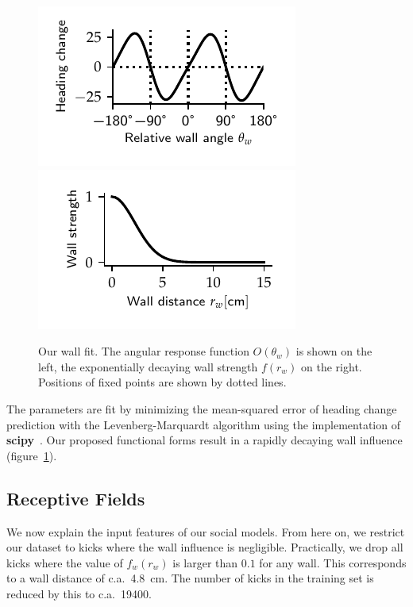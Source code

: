\documentclass[nobib, a4paper]{tufte-handout}
\begin{document}
\begin{figure}[htb]
 \centering
 \includegraphics{wall_odd}~%
 \includegraphics{wall_force} 
 \caption{Our wall fit.
   The angular response function $O(\theta_w)$ is shown on the left, the exponentially decaying wall strength $f(r_w)$ on the right.
 Positions of fixed points are shown by dotted lines.}
\label{fig:wall-fit}
\end{figure}

The parameters are fit by minimizing the mean-squared error of heading change prediction with the Levenberg-Marquardt algorithm using the implementation of \textbf{scipy}~\autocite{scipy}.
Our proposed functional forms result in a rapidly decaying wall influence (figure~\ref{fig:wall-fit}).


\subsection{Receptive Fields}
We now explain the input features of our social models.
From here on, we restrict our dataset to kicks where the wall influence is negligible.
Practically, we drop all kicks where the value of \(f_w(r_w)\) is larger than $0.1$ for any wall.
This corresponds to a wall distance of c.a.\ \SI{4.8}{\cm}.
The number of kicks in the training set is reduced by this to c.a.\ 19400.

\end{document}
